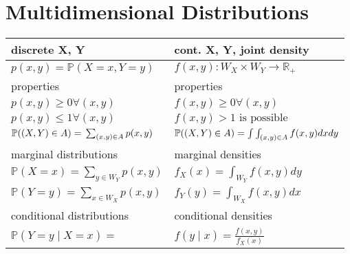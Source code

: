 \section{Multidimensional Distributions}
\renewcommand{\arraystretch}{1.3}
\setlength\tabcolsep{6pt} %
{\small %
    \begin{tabularx}{\linewidth}{X|X}
        discrete X, Y                                                              & cont. X, Y, joint density                                                \\
        \toprule
        $p(x,y)=\mathbb{P}(X=x,Y=y)$                                               & $f(x,y)\colon W_X\times W_Y\to\mathbb{R_+}$                              \\
        properties                                                                 & properties                                                               \\
        $p(x,y)\ge0\forall(x,y)$                                                   & $f(x,y)\geq0\forall(x,y)$                                                \\
        $p(x,y)\le1\forall(x,y)$                                                   & $f(x,y)>1\text{ is possible}$                                            \\
        $\mathbb{P}((X,Y)\in A)=\newline\sum_{(x,y)\in A}p(x,y)$                   & $\mathbb{P}((X,Y)\in A)\newline=\int\int_{(x,y)\in A}f(x,y)dxdy$         \\
        \midrule
        marginal distributions                                                     & marginal densities                                                       \\
        $\mathbb P(X=x)=\sum_{y\in W_Y}p(x,y)$                                     & $f_X(x)=\int_{W_Y}f(x,y)dy$                                              \\
        $\mathbb P(Y=y)=\sum_{x\in W_X}p(x,y)$                                     & $f_Y(y)=\int_{W_X}f(x,y)dx$                                              \\
        \midrule
        conditional distributions                                                  & conditional densities                                                    \\
        $\mathbb{P}(Y=y\mid X=x)=$                                                 & $f(y\mid x)=\frac{f(x,y)}{f_X(x)}$                                       \\

\end{tabularx}}
